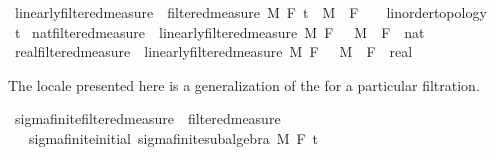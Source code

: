 \begin{isabellebody}
\endisatagproof
{\isafoldproof}%
%
\isadelimproof
\isanewline
%
\endisadelimproof
\isanewline
{}\isamarkupfalse%
\isanewline
\isanewline
{}\isamarkupfalse%
\ linearly{\isacharunderscore}{\kern0pt}filtered{\isacharunderscore}{\kern0pt}measure\ {\isacharequal}{\kern0pt}\ filtered{\isacharunderscore}{\kern0pt}measure\ M\ F\ t\ \ M\ \ F\ {\isacharcolon}{\kern0pt}{\isacharcolon}{\kern0pt}\ {\isachardoublequoteopen}{\isacharunderscore}{\kern0pt}\ {\isacharcolon}{\kern0pt}{\isacharcolon}{\kern0pt}\ {\isacharbraceleft}{\kern0pt}linorder{\isacharunderscore}{\kern0pt}topology{\isacharbraceright}{\kern0pt}\ {\isasymRightarrow}\ {\isacharunderscore}{\kern0pt}{\isachardoublequoteclose}\ \ t\isanewline
\isanewline
{}\isamarkupfalse%
\ nat{\isacharunderscore}{\kern0pt}filtered{\isacharunderscore}{\kern0pt}measure\ {\isacharequal}{\kern0pt}\ linearly{\isacharunderscore}{\kern0pt}filtered{\isacharunderscore}{\kern0pt}measure\ M\ F\ {}\ \ M\ \ F\ {\isacharcolon}{\kern0pt}{\isacharcolon}{\kern0pt}\ {\isachardoublequoteopen}nat\ {\isasymRightarrow}\ {\isacharunderscore}{\kern0pt}{\isachardoublequoteclose}\isanewline
{}\isamarkupfalse%
\ real{\isacharunderscore}{\kern0pt}filtered{\isacharunderscore}{\kern0pt}measure\ {\isacharequal}{\kern0pt}\ linearly{\isacharunderscore}{\kern0pt}filtered{\isacharunderscore}{\kern0pt}measure\ M\ F\ {}\ \ M\ \ F\ {\isacharcolon}{\kern0pt}{\isacharcolon}{\kern0pt}\ {\isachardoublequoteopen}real\ {\isasymRightarrow}\ {\isacharunderscore}{\kern0pt}{\isachardoublequoteclose}%
\isadelimdocument
%
\endisadelimdocument
%
\isatagdocument
%
\isamarkuptrue%
%
\endisatagdocument
{\isafolddocument}%
%
\isadelimdocument
%
\endisadelimdocument
%
\begin{isamarkuptext}%
The locale presented here is a generalization of the  for a particular filtration.%
\end{isamarkuptext}\isamarkuptrue%
\isamarkupfalse%
\ sigma{\isacharunderscore}{\kern0pt}finite{\isacharunderscore}{\kern0pt}filtered{\isacharunderscore}{\kern0pt}measure\ {\isacharequal}{\kern0pt}\ filtered{\isacharunderscore}{\kern0pt}measure\ {\isacharplus}{\kern0pt}\isanewline
\ \ \ sigma{\isacharunderscore}{\kern0pt}finite{\isacharunderscore}{\kern0pt}initial{\isacharcolon}{\kern0pt}\ {\isachardoublequoteopen}sigma{\isacharunderscore}{\kern0pt}finite{\isacharunderscore}{\kern0pt}subalgebra\ M\ {\isacharparenleft}{\kern0pt}F\ t\isanewline

\end{isabellebody}
